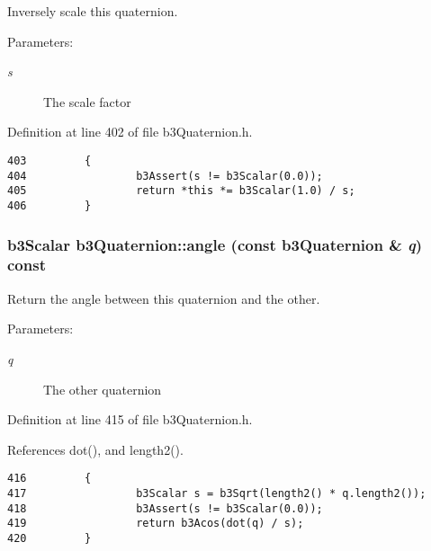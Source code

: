 Inversely scale this quaternion. 

\begin{Desc}
\item[Parameters:]
\begin{description}
\item[{\em s}]The scale factor \end{description}
\end{Desc}


Definition at line 402 of file b3Quaternion.h.

\begin{Code}\begin{verbatim}403         {
404                 b3Assert(s != b3Scalar(0.0));
405                 return *this *= b3Scalar(1.0) / s;
406         }
\end{verbatim}
\end{Code}


\hypertarget{classb3_quaternion_cbdc532e53c4319bd2b8c760764a9452}{
\subsubsection[angle]{\setlength{\rightskip}{0pt plus 5cm}b3Scalar b3Quaternion::angle (const {\bf b3Quaternion} \& {\em q}) const}}
\label{classb3_quaternion_cbdc532e53c4319bd2b8c760764a9452}


Return the angle between this quaternion and the other. 

\begin{Desc}
\item[Parameters:]
\begin{description}
\item[{\em q}]The other quaternion \end{description}
\end{Desc}


Definition at line 415 of file b3Quaternion.h.

References dot(), and length2().

\begin{Code}\begin{verbatim}416         {
417                 b3Scalar s = b3Sqrt(length2() * q.length2());
418                 b3Assert(s != b3Scalar(0.0));
419                 return b3Acos(dot(q) / s);
420         }
\end{verbatim}
\end{Code}





